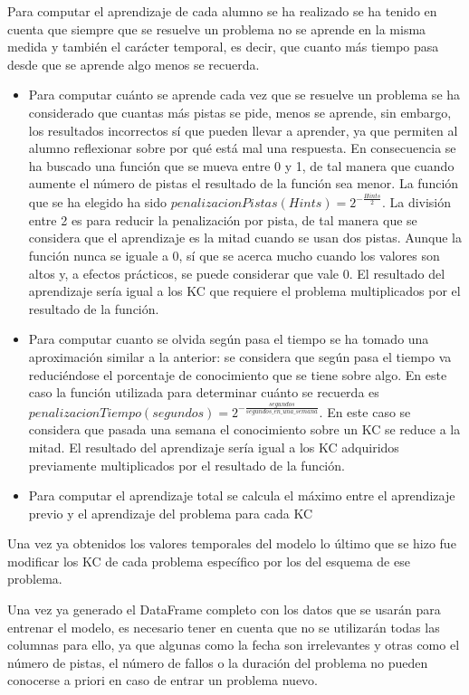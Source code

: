 \documentclass[acmtog, screen]{acmart}
\begin{document}
Para computar el aprendizaje de cada alumno se ha realizado se ha tenido en cuenta que siempre que se resuelve un problema no se aprende en la misma medida y también el carácter temporal, es decir, que cuanto más tiempo pasa desde que se aprende algo menos se recuerda.
\begin{itemize}
	\item Para computar cuánto se aprende cada vez que se resuelve un problema se ha considerado que cuantas más pistas se pide, menos se aprende, sin embargo, los resultados incorrectos sí que pueden llevar a aprender, ya que permiten al alumno reflexionar sobre por qué está mal una respuesta. En consecuencia se ha buscado una función que se mueva entre 0 y 1, de tal manera que cuando aumente el número de pistas el resultado de la función sea menor. La función que se ha elegido ha sido $penalizacionPistas(Hints)=2^{-\frac{Hints}{2}}$. La división entre 2 es para reducir la penalización por pista, de tal manera que se considera que el aprendizaje es la mitad cuando se usan dos pistas. Aunque la función nunca se iguale a 0, sí que se acerca mucho cuando los valores son altos y, a efectos prácticos, se puede considerar que vale 0. El resultado del aprendizaje sería igual a los KC que requiere el problema multiplicados por el resultado de la función.
	\item Para computar cuanto se olvida según pasa el tiempo se ha tomado una aproximación similar a la anterior: se considera que según pasa el tiempo va reduciéndose el porcentaje de conocimiento que se tiene sobre algo. En este caso la función utilizada para determinar cuánto se recuerda es $penalizacionTiempo(segundos)=2^{-\frac{segundos}{segundos\_en\_una\_semana}}$. En este caso se considera que pasada una semana el conocimiento sobre un KC se reduce a la mitad. El resultado del aprendizaje sería igual a los KC adquiridos previamente multiplicados por el resultado de la función.
	\item Para computar el aprendizaje total se calcula el máximo entre el aprendizaje previo y el aprendizaje del problema para cada KC
\end{itemize}

Una vez ya obtenidos los valores temporales del modelo lo último que se hizo fue modificar los KC de cada problema específico por los del esquema de ese problema.

Una vez ya generado el DataFrame completo con los datos que se usarán para entrenar el modelo, es necesario tener en cuenta que no se utilizarán todas las columnas para ello, ya que algunas como la fecha son irrelevantes y otras como el número de pistas, el número de fallos o la duración del problema no pueden conocerse a priori en caso de entrar un problema nuevo.
\end{document}
